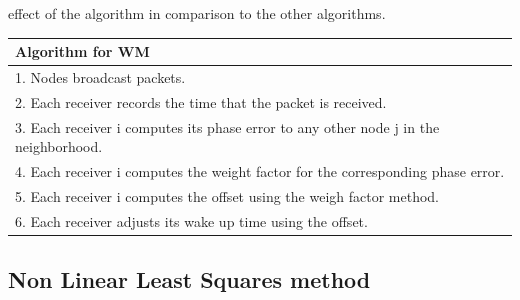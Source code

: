 \documentclass[a4paper,10pt]{report}
\begin{document}
effect of the algorithm in comparison to the other algorithms.\newline \newline
\begin{tabular}{  l }Algorithm for WM \\\hline \hline
1. Nodes broadcast packets. \\  2. Each receiver records the time that the packet is received. \\
3. Each receiver i computes its phase error to any other node j in the neighborhood. \\
4. Each receiver i computes the weight factor for the corresponding phase error. \\
5. Each receiver i computes the offset using the weigh factor method. \\
6. Each receiver adjusts its wake up time using the offset.\\
\hline \hline
\end{tabular}
\subsection{\textbf{Non Linear Least Squares method}}
\end{document}
